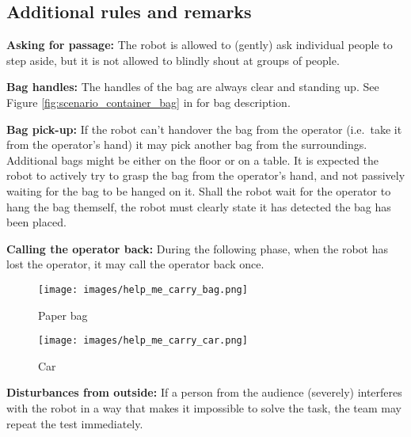 \subsection{Additional rules and remarks}
\begin{enumerate}
  \begin{minipage}{0.65\textwidth}
  \item \textbf{Asking for passage:} The robot is allowed to (gently) ask individual people to step aside, but it is not allowed to blindly shout at groups of people.

  \item \textbf{Bag handles:} The handles of the bag are always clear and standing up. See Figure \ref{fig:scenario_container_bag} in  for bag description. \footnotemark 

  \item \textbf{Bag pick-up:} If the robot can't handover the bag from the operator (i.e.~take it from the operator's hand) it may pick another bag from the surroundings. Additional bags might be either on the floor or on a table. It is expected the robot to actively try to grasp the bag from the operator's hand, and not passively waiting for the bag to be hanged on it. Shall the robot wait for the operator to hang the bag themself, the robot must clearly state it has detected the bag has been placed.

  \item \textbf{Calling the operator back:} During the following phase, when the robot has lost the operator, it may call the operator back once.
  \end{minipage}\hfill%
  \begin{minipage}{0.65\textwidth}
  \end{minipage}\hfill
  \begin{minipage}{0.25\textwidth}
    \vspace{-20pt}
    \begin{figure}[H]
      \centering
      \texttt{[image: images/help\_me\_carry\_bag.png]}%
      \vspace{-10pt}
      \caption{Paper bag}
      \label{fig:help_me_carry_paper_bag}
    \end{figure}
    \vspace{-10pt}
    \begin{figure}[H]
      \centering
      \texttt{[image: images/help\_me\_carry\_car.png]}%
      \vspace{-20pt}
      \label{fig:help_me_carry_car}
      \caption{Car}
    \end{figure}
  \end{minipage}
  \item \textbf{Disturbances from outside:} If a person from the audience (severely) interferes with the robot in a way that makes it impossible to solve the task, the team may repeat the test immediately.


\end{enumerate}

